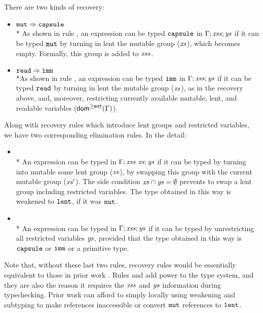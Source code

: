 There are two kinds of recovery:
\begin{itemize}
\item $\texttt{mut}\Rightarrow\texttt{capsule}$
\\* As shown in rule , an expression can be typed $\texttt{capsule}$ in $\Gamma;\mathit{xss};\mathit{ys}$ if it can be typed $\texttt{mut}$ by turning in lent the mutable group ($\mathit{xs}$), which becomes empty.
Formally, this group is added to $\mathit{xss}$.  
\item $\texttt{read}\Rightarrow\texttt{imm}$ 
\\*As shown in rule , an expression can be typed $\texttt{imm}$ in $\Gamma;\mathit{xss};\mathit{ys}$  if it can be typed $\texttt{read}$ by {turning in lent the mutable group ($\mathit{xs}$)}, as in the {recovery} above, and, moreover, restricting currently available mutable, lent, and readable variables (${\textsf{dom}^{\geq\texttt{mut}}}(\Gamma)$).
\end{itemize}

Along with {recovery} rules which introduce {lent group}s and restricted variables, we have two corresponding elimination rules.
In the detail:
\begin{itemize}
\item{}
\\* An expression can be typed in $\Gamma;\mathit{xss}\ \mathit{xs};\mathit{ys}$ if it can be typed by turning into mutable 
some {lent group} {($\mathit{xs}$)}, by swapping this group with the {current mutable group}  ($\mathit{xs}'$). {The side condition $\mathit{xs}\cap\mathit{ys}=\emptyset$ prevents to swap a lent group including restricted variables.}
The type obtained in this way is weakened to $\texttt{lent}$, if it was $\texttt{mut}$.
\item
{} 
\\* An expression can be typed in $\Gamma;\mathit{xss};\mathit{ys}$ if it can be typed by unrestricting all restricted variables {$\mathit{ys}$}, provided that the type obtained in this way is $\texttt{capsule}$ or $\texttt{imm}$ {or a primitive type}.
\end{itemize}

{Note that, without these last two rules, recovery rules would be essentially equivalent to those in prior work \cite{GordonEtAl12,ClebschEtAl15}. Rules  and   add power to the type system, and they are also the reason {it} requires the $\mathit{xss}$ and $\mathit{ys}$ information during typechecking.
Prior work \cite{GordonEtAl12,ClebschEtAl15} can afford to simply locally using weakening and subtyping to make references inaccessible
or convert $\texttt{mut}$ references to $\texttt{lent}$.}

